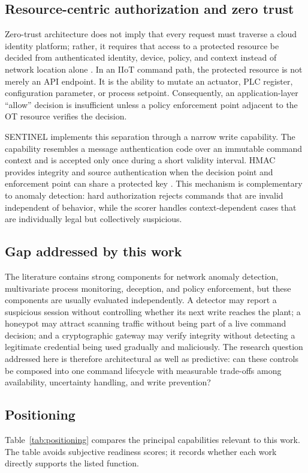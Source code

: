 \documentclass[journal]{IEEEtran}
\begin{document}
\subsection{Resource-centric authorization and zero trust}
Zero-trust architecture does not imply that every request must traverse a cloud identity platform; rather, it requires that access to a protected resource be decided from authenticated identity, device, policy, and context instead of network location alone \cite{nist207}. In an IIoT command path, the protected resource is not merely an API endpoint. It is the ability to mutate an actuator, PLC register, configuration parameter, or process setpoint. Consequently, an application-layer ``allow'' decision is insufficient unless a policy enforcement point adjacent to the OT resource verifies the decision.

SENTINEL implements this separation through a narrow write capability. The capability resembles a message authentication code over an immutable command context and is accepted only once during a short validity interval. HMAC provides integrity and source authentication when the decision point and enforcement point can share a protected key \cite{rfc2104}. This mechanism is complementary to anomaly detection: hard authorization rejects commands that are invalid independent of behavior, while the scorer handles context-dependent cases that are individually legal but collectively suspicious.

\subsection{Gap addressed by this work}
The literature contains strong components for network anomaly detection, multivariate process monitoring, deception, and policy enforcement, but these components are usually evaluated independently. A detector may report a suspicious session without controlling whether its next write reaches the plant; a honeypot may attract scanning traffic without being part of a live command decision; and a cryptographic gateway may verify integrity without detecting a legitimate credential being used gradually and maliciously. The research question addressed here is therefore architectural as well as predictive: can these controls be composed into one command lifecycle with measurable trade-offs among availability, uncertainty handling, and write prevention?

\subsection{Positioning}
Table~\ref{tab:positioning} compares the principal capabilities relevant to this work. The table avoids subjective readiness scores; it records whether each work directly supports the listed function.
\end{document}
